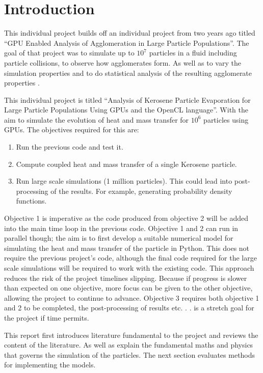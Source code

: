 \documentclass[../Interim_Report_Master]{subfiles}
\begin{document}
\hypertarget{intro}{\section*{Introduction}\label{intro}}
This individual project builds off an individual project from two years ago titled ``GPU Enabled Analysis of Agglomeration in Large Particle Populations''. The goal of that project was to simulate up to $10^7$ particles in a fluid including particle collisions, to observe how agglomerates form. As well as to vary the simulation properties and to do statistical analysis of the resulting agglomerate properties \cite{Elijah_GPU_Report}. 

This individual project is titled ``Analysis of Kerosene Particle Evaporation for Large Particle Populations Using GPUs and the OpenCL language''. With the aim to simulate the evolution of heat and mass transfer for $10^6$ particles using GPUs. The objectives required for this are:
\begin{enumerate}
	\item Run the previous code and test it.
	\item Compute coupled heat and mass transfer of a single Kerosene particle.
	\item Run large scale simulations (1 million particles). This could lead into post-processing of the results. For example, generating probability density functions.
\end{enumerate}

Objective 1 is imperative as the code produced from objective 2 will be added into the main time loop in the previous code. Objective 1 and 2 can run in parallel though; the aim is to first develop a suitable numerical model for simulating the heat and mass transfer of the particle in Python. This does not require the previous project's code, although the final code required for the large scale simulations will be required to work with the existing code. This approach reduces the risk of the project timelines slipping. Because if progress is slower than expected on one objective, more focus can be given to the other objective, allowing the project to continue to advance. Objective 3 requires both objective 1 and 2 to be completed, the post-processing of results etc. . . is a stretch goal for the project if time permits.

This report first introduces literature fundamental to the project and reviews the content of the literature. As well as explain the fundamental maths and physics that governs the simulation of the particles. The next section evaluates methods for implementing the models. 
\end{document}
